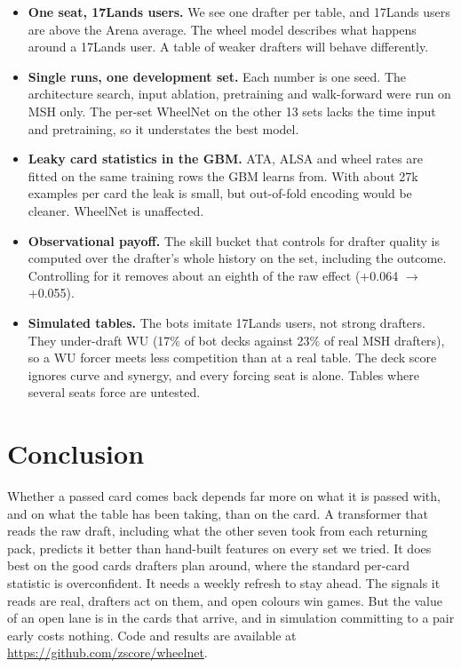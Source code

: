 \documentclass[10pt,letterpaper]{article}
\begin{document}
\begin{itemize}
\item \textbf{One seat, 17Lands users.} We see one drafter per table, and 17Lands users are above the Arena average.
The wheel model describes what happens around a 17Lands user. A table of weaker drafters will behave
differently.
\item \textbf{Single runs, one development set.} Each number is one seed. The architecture search, input ablation,
pretraining and walk-forward were run on MSH only. The per-set WheelNet on the other 13 sets lacks the time
input and pretraining, so it understates the best model.
\item \textbf{Leaky card statistics in the GBM.} ATA, ALSA and wheel rates are fitted on the same training rows
the GBM learns from. With about 27k examples per card the leak is small, but out-of-fold encoding would be
cleaner. WheelNet is unaffected.
\item \textbf{Observational payoff.} The skill bucket that controls for drafter quality is computed over the
drafter's whole history on the set, including the outcome. Controlling for it removes about an eighth of the raw effect (+0.064 $\to$ +0.055).
\item \textbf{Simulated tables.} The bots imitate 17Lands users, not strong drafters. They under-draft WU (17\%
of bot decks against 23\% of real MSH drafters), so a WU forcer meets less competition than at a real table.
The deck score ignores curve and synergy, and every forcing seat is alone. Tables where several seats force
are untested.
\end{itemize}

\section{Conclusion}

Whether a passed card comes back depends far more on what it is passed with, and on what the table has been
taking, than on the card. A transformer that reads the raw draft, including what the other seven took from each
returning pack, predicts it better than hand-built features on every set we tried. It does best on the good cards
drafters plan around, where the standard per-card statistic is overconfident. It needs a weekly refresh to stay
ahead. The signals it reads are real, drafters act on them, and open colours win games. But the value of an open
lane is in the cards that arrive, and in simulation committing to a pair early costs nothing. Code and results
are available at \url{https://github.com/zscore/wheelnet}.
\end{document}
